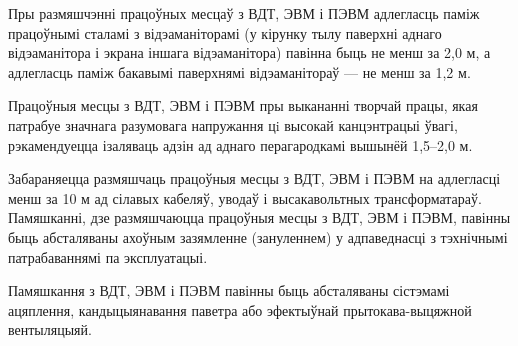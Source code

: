 Пры размяшчэнні працоўных месцаў з ВДТ, ЭВМ і ПЭВМ адлегласць паміж працоўнымі сталамі з відэаманіторамі (у кірунку тылу паверхні аднаго відэаманітора і экрана іншага відэаманітора) павінна быць не менш за 2,0 м, а адлегласць паміж бакавымі паверхнямі відэаманітораў --- не менш за 1,2 м.

Працоўныя месцы з ВДТ, ЭВМ і ПЭВМ пры выкананні творчай працы, якая патрабуе значнага разумовага напружання цi высокай канцэнтрацыі ўвагі, рэкамендуецца ізаляваць адзін ад аднаго перагародкамі вышынёй 1,5--2,0 м.

Забараняецца размяшчаць працоўныя месцы з ВДТ, ЭВМ і ПЭВМ на адлегласці менш за 10 м ад сілавых кабеляў, уводаў і высакавольтных трансформатараў. Памяшканні, дзе размяшчаюцца працоўныя месцы з ВДТ, ЭВМ і ПЭВМ, павінны быць абсталяваны ахоўным зазямленне (зануленнем) у адпаведнасці з тэхнічнымі патрабаваннямі па эксплуатацыі.

Памяшкання з ВДТ, ЭВМ і ПЭВМ павінны быць абсталяваны сістэмамі ацяплення, кандыцыянавання паветра або эфектыўнай прытокава-выцяжной вентыляцыяй.
